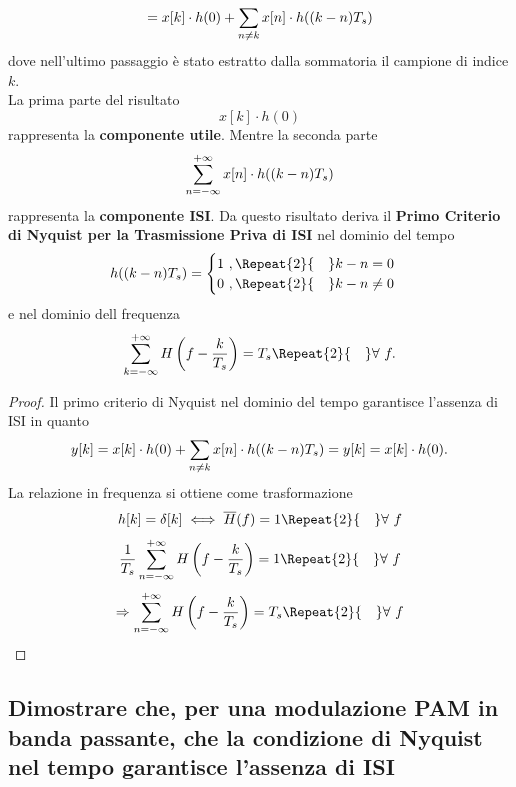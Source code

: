 \documentclass[12pt,oneside,openany]{memoir}
\numberwithin{equation}{subsection}
\newcommand{\quads}[1]{\Repeat{#1}{\quad}}
\begin{document}
\[
    = x[k] \cdot h(0) + \sum\displaylimits_{n \neq k} x[n] \cdot h((k - n) T_s)
\]
dove nell'ultimo passaggio \`e stato estratto dalla sommatoria il campione di
indice $k$.\\
La prima parte del risultato
\[
    x[k] \cdot h(0)
\]
rappresenta la \textbf{componente utile}. Mentre la seconda parte
\[
    \sum\displaylimits_{n = -\infty}^{+\infty} x[n] \cdot h((k - n) T_s)
\]
rappresenta la \textbf{componente ISI}.
Da questo risultato deriva il \textbf{Primo Criterio di Nyquist per la
Trasmissione Priva di ISI} nel dominio del tempo
\[
    h((k - n)T_s) =
        \begin{cases}
            1 \ , \quads{2} k - n = 0\\
            0 \ , \quads{2} k - n \neq 0
        \end{cases}
\]
e nel dominio dell frequenza
\[
    \sum\displaylimits_{k = -\infty}^{+\infty} H\left(f - \frac{k}{T_s}\right) =
    T_s \quads{2} \forall \ f.
\]
\begin{proof}
Il primo criterio di Nyquist nel dominio del tempo garantisce l'assenza di ISI
in quanto
\[
    y[k] = x[k] \cdot h(0) + \sum\displaylimits_{n \neq k} x[n] \cdot
    h((k - n) T_s) = y[k] = x[k] \cdot h(0).
\]
La relazione in frequenza si ottiene come trasformazione
\[
    h[k] = \delta[k] \iff \overline{H}(f) = 1 \quads{2} \forall \ f
\]
\[
    \frac{1}{T_s} \sum\displaylimits_{n = -\infty}^{+\infty}
    H\left(f - \frac{k}{T_s}\right) = 1 \quads{2} \forall \ f
\]
\[
    \Rightarrow \sum\displaylimits_{n = -\infty}^{+\infty}
    H\left(f - \frac{k}{T_s}\right) = T_s \quads{2} \forall \ f
\]
\end{proof}


\newpage
\subsection{Dimostrare che, per una modulazione PAM in banda passante, che la
condizione di Nyquist nel tempo garantisce l'assenza di ISI}

\end{document}
